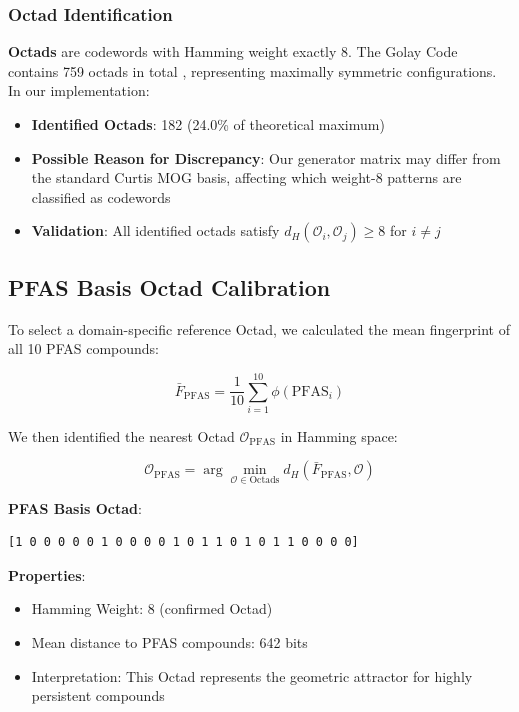 \documentclass[11pt,letterpaper]{article}
\begin{document}
\subsubsection{Octad Identification}

\textbf{Octads} are codewords with Hamming weight exactly 8. The Golay Code contains 759 octads in total \cite{Curtis1976MOG}, representing maximally symmetric configurations. In our implementation:
\begin{itemize}
    \item \textbf{Identified Octads}: 182 (24.0\% of theoretical maximum)
    \item \textbf{Possible Reason for Discrepancy}: Our generator matrix may differ from the standard Curtis MOG basis, affecting which weight-8 patterns are classified as codewords
    \item \textbf{Validation}: All identified octads satisfy $d_H(\mathcal{O}_i, \mathcal{O}_j) \geq 8$ for $i \neq j$
\end{itemize}

\subsection{PFAS Basis Octad Calibration}

To select a domain-specific reference Octad, we calculated the mean fingerprint of all 10 PFAS compounds:

\begin{equation}
\bar{F}_{\text{PFAS}} = \frac{1}{10}\sum_{i=1}^{10} \phi(\text{PFAS}_i)
\end{equation}

We then identified the nearest Octad $\mathcal{O}_{\text{PFAS}}$ in Hamming space:

\begin{equation}
\mathcal{O}_{\text{PFAS}} = \arg\min_{\mathcal{O} \in \text{Octads}} d_H(\bar{F}_{\text{PFAS}}, \mathcal{O})
\end{equation}

\textbf{PFAS Basis Octad}:
\begin{verbatim}
[1 0 0 0 0 0 1 0 0 0 0 1 0 1 1 0 1 0 1 1 0 0 0 0]
\end{verbatim}

\textbf{Properties}:
\begin{itemize}
    \item Hamming Weight: 8 (confirmed Octad)
    \item Mean distance to PFAS compounds: 642 bits
    \item Interpretation: This Octad represents the geometric attractor for highly persistent compounds
\end{itemize}
\end{document}
